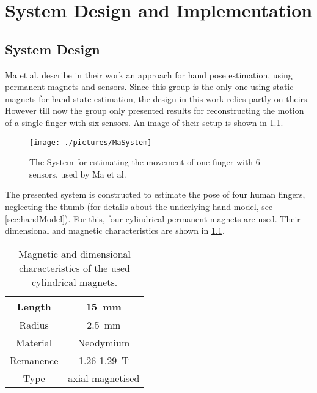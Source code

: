 \lhead[\chaptername~\thechapter]{\rightmark}

\rhead[\leftmark]{}

\lfoot[\thepage]{}

\cfoot{}

\rfoot[]{\thepage}

\chapter{System Design and Implementation} \label{cha:sysDesign}

\section{System Design} \label{cha:design}

Ma et al. \cite{ma2010magnetic} describe in their work an approach for hand pose estimation, using permanent magnets and sensors. Since this group is the only one using static magnets for hand state estimation, the design in this work relies partly on theirs. However till now the group only presented results for reconstructing the motion of a single finger with six sensors. An image of their setup is shown in \ref{fig:MaSystem}.
\begin{figure}[h]
\centering
\texttt{[image: ./pictures/MaSystem]}
\caption[Magnetic system, developed by Ma et al.]
{The System for estimating the movement of one finger with 6 sensors, used by Ma et al. \cite{ma2010magnetic}}
\label{fig:MaSystem}
\end{figure}
The presented system is constructed to estimate the pose of four human fingers, neglecting the thumb (for details about the underlying hand model, see \ref{sec:handModel}). For this, four cylindrical permanent magnets are used. Their dimensional and magnetic characteristics are shown in \ref{tab:magDimensions}.
\begin{table}[h]
\centering
\begin{tabular}{c|c}
	Length & \SI{15}{\mm} \\ \hline
	Radius & \SI{2.5}{\mm} \\ \hline
	Material & Neodymium \\ \hline
	Remanence & 1.26-\SI{1.29}{\tesla} \\ \hline
	Type & axial magnetised \\ %
\end{tabular}
\caption[Magnetic properties]{Magnetic and dimensional characteristics of the used cylindrical magnets.}
\label{tab:magDimensions}
\end{table}
